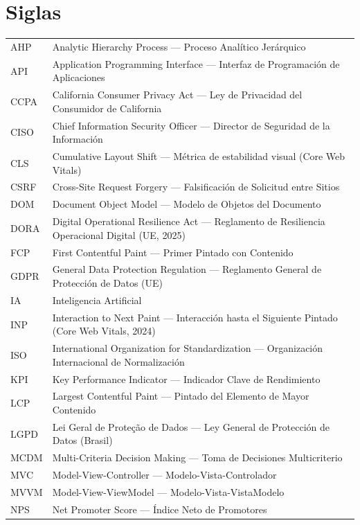 \section*{Siglas}
\begin{longtable}{@{}p{2.2cm}p{12.5cm}@{}}
AHP & Analytic Hierarchy Process --- Proceso Analítico Jerárquico \\
API & Application Programming Interface --- Interfaz de Programación de Aplicaciones \\
CCPA & California Consumer Privacy Act --- Ley de Privacidad del Consumidor de California \\
CISO & Chief Information Security Officer --- Director de Seguridad de la Información \\
CLS & Cumulative Layout Shift --- Métrica de estabilidad visual (Core Web Vitals) \\
CSRF & Cross-Site Request Forgery --- Falsificación de Solicitud entre Sitios \\
DOM & Document Object Model --- Modelo de Objetos del Documento \\
DORA & Digital Operational Resilience Act --- Reglamento de Resiliencia Operacional Digital (UE, 2025) \\
FCP & First Contentful Paint --- Primer Pintado con Contenido \\
GDPR & General Data Protection Regulation --- Reglamento General de Protección de Datos (UE) \\
IA & Inteligencia Artificial \\
INP & Interaction to Next Paint --- Interacción hasta el Siguiente Pintado (Core Web Vitals, 2024) \\
ISO & International Organization for Standardization --- Organización Internacional de Normalización \\
KPI & Key Performance Indicator --- Indicador Clave de Rendimiento \\
LCP & Largest Contentful Paint --- Pintado del Elemento de Mayor Contenido \\
LGPD & Lei Geral de Proteção de Dados --- Ley General de Protección de Datos (Brasil) \\
MCDM & Multi-Criteria Decision Making --- Toma de Decisiones Multicriterio \\
MVC & Model-View-Controller --- Modelo-Vista-Controlador \\
MVVM & Model-View-ViewModel --- Modelo-Vista-VistaModelo \\
NPS & Net Promoter Score --- Índice Neto de Promotores \\

\end{longtable}
